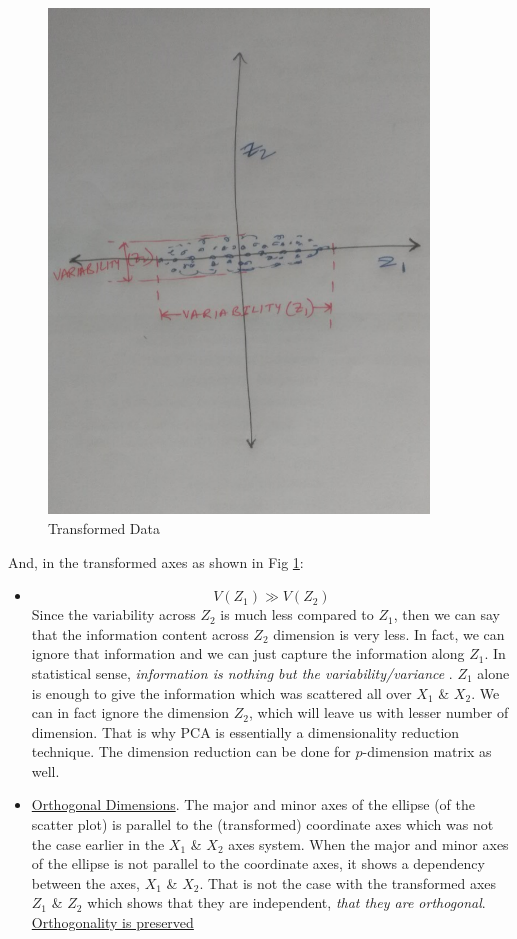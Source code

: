 \documentclass[12pt,a4paper]{report}
\begin{document}
\begin{figure}[!ht] \label{FigPCA4}
    \centering
    \includegraphics[width = 0.9\textwidth]{SVM/SVMImages/PCA2.PNG}
    \caption{Transformed Data}
\end{figure}
And, in the transformed axes as shown in Fig \ref{FigPCA4}:
\begin{itemize}
\item 
\begin{equation}
V(Z_1) \gg V(Z_2)
\end{equation}
Since the variability across $Z_2$ is much less compared to $Z_1$, then we can say that the information content across $Z_2$ dimension is very less. In fact, we can ignore that information and we can just capture the information along $Z_1$. In statistical sense, \textit{information is nothing but the variability/variance }. $Z_1$ alone is enough to give the information which was scattered all over $X_1$ \& $X_2$. We can in fact ignore the dimension $Z_2$, which will leave us with lesser number of dimension. That is why PCA is essentially a dimensionality reduction technique. The dimension reduction can be done for $p$-dimension matrix as well.\\
\item \underline{Orthogonal Dimensions}.
The major and minor axes of the ellipse (of the scatter plot) is parallel to the (transformed) coordinate axes which was not the case earlier in the $X_1$ \& $X_2$ axes system. When the major and minor axes of the ellipse is not parallel to the coordinate axes, it shows a dependency between the axes,  $X_1$ \& $X_2$. That is not the case with the transformed axes  $Z_1$ \& $Z_2$ which shows that they are independent, \textit{that they are orthogonal}. \underline{Orthogonality is preserved}
\end{itemize}
\end{document}
